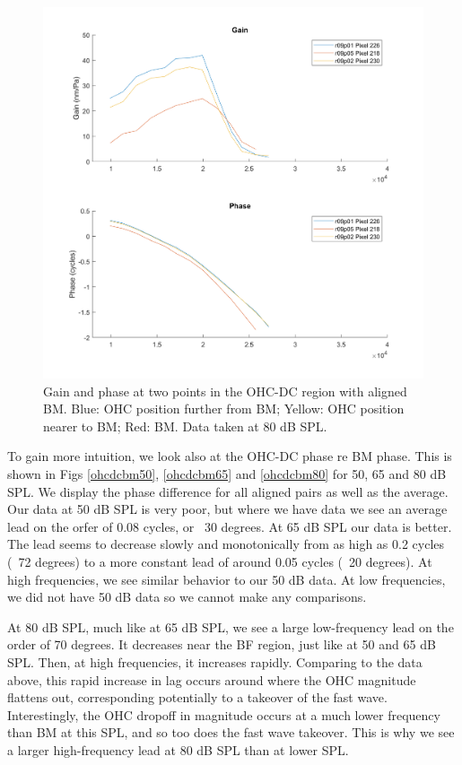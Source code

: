\documentclass{article}
\begin{document}
\begin{figure}
	\centering
	\includegraphics[width=\textwidth]{Figures/ohcdcp2pts80dB.png}
	\caption{Gain and phase at two points in the OHC-DC region with aligned BM. Blue: OHC position further from BM; Yellow: OHC position nearer to BM; Red: BM. Data taken at 80 dB SPL.}
	\label{2pt80}
\end{figure}

\par{To gain more intuition, we look also at the OHC-DC phase re BM phase. This is shown in Figs \ref{ohcdcbm50}, \ref{ohcdcbm65} and \ref{ohcdcbm80} for 50, 65 and 80 dB SPL. We display the phase difference for all aligned pairs as well as the average. Our data at 50 dB SPL is very poor, but where we have data we see an average lead on the orfer of 0.08 cycles, or ~30 degrees. At 65 dB SPL our data is better. The lead seems to decrease slowly and monotonically from as high as 0.2 cycles (~72 degrees) to a more constant lead of around 0.05 cycles (~20 degrees). At high frequencies, we see similar behavior to our 50 dB data. At low frequencies, we did not have 50 dB data so we cannot make any comparisons.}
\par{At 80 dB SPL, much like at 65 dB SPL, we see a large low-frequency lead on the order of 70 degrees. It decreases near the BF region, just like at 50 and 65 dB SPL. Then, at high frequencies, it increases rapidly. Comparing to the data above, this rapid increase in lag occurs around where the OHC magnitude flattens out, corresponding potentially to a takeover of the fast wave. Interestingly, the OHC dropoff in magnitude occurs at a much lower frequency than BM at this SPL, and so too does the fast wave takeover. This is why we see a larger high-frequency lead at 80 dB SPL than at lower SPL.}
\end{document}
